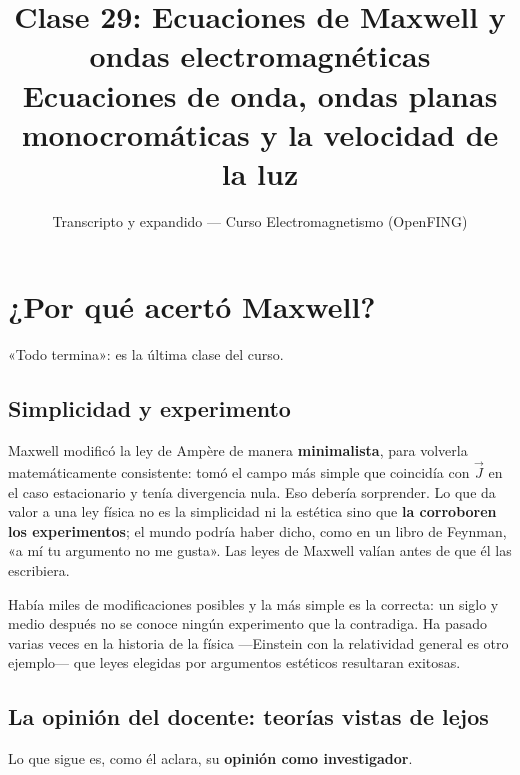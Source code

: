 \documentclass[12pt,a4paper]{article}
\title{\textbf{Clase 29: Ecuaciones de Maxwell y ondas electromagnéticas} \\[0.3em]
        \large{Ecuaciones de onda, ondas planas monocromáticas y la velocidad de la luz}}
\author{Transcripto y expandido --- Curso Electromagnetismo (OpenFING)}
\date{}
\begin{document}
\maketitle
\thispagestyle{empty}
\newpage

\tableofcontents
\newpage

\section{¿Por qué acertó Maxwell?}

«Todo termina»: es la última clase del curso.

\subsection{Simplicidad y experimento}

Maxwell modificó la ley de Ampère de manera \textbf{minimalista}, para volverla
matemáticamente consistente: tomó el campo más simple que coincidía con
$\vec J$ en el caso estacionario y tenía divergencia nula. Eso debería
sorprender. Lo que da valor a una ley física no es la simplicidad ni la
estética sino que \textbf{la corroboren los experimentos}; el mundo podría haber
dicho, como en un libro de Feynman, «a mí tu argumento no me gusta». Las leyes
de Maxwell valían antes de que él las escribiera.

Había miles de modificaciones posibles y la más simple es la correcta: un siglo
y medio después no se conoce ningún experimento que la contradiga. Ha pasado
varias veces en la historia de la física ---Einstein con la relatividad general
es otro ejemplo--- que leyes elegidas por argumentos estéticos resultaran
exitosas.

\subsection{La opinión del docente: teorías vistas de lejos}

\begin{notebox}
Lo que sigue es, como él aclara, su \textbf{opinión como investigador}.
\end{notebox}
\end{document}
